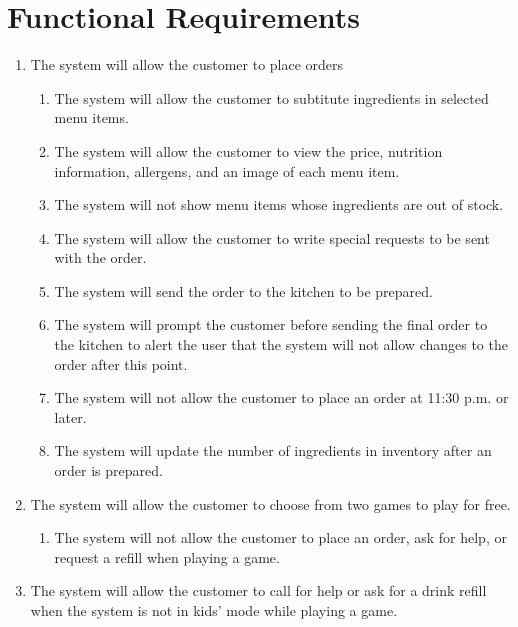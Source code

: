 \documentclass[12pt]{article}
\begin{document}
	\section{Functional Requirements}
		\begin{enumerate}
			\item The system will allow the customer to place orders
			\begin{enumerate}
				\item The system will allow the customer to subtitute ingredients in selected menu items.
				\item The system will allow the customer to view the price, nutrition information, allergens, and an image of each menu item.
				\item The system will not show menu items whose ingredients are out of stock.
				\item The system will allow the customer to write special requests to be sent with the order.
				\item The system will send the order to the kitchen to be prepared.
				\item The system will prompt the customer before sending the final order to the kitchen to alert the user that the system will not allow changes to the order after this point.
				\item The system will not allow the customer to place an order at 11:30 p.m. or later.
				\item The system will update the number of ingredients in inventory after an order is prepared.
			\end{enumerate}

			\item The system will allow the customer to choose from two games to play for free.
				\begin{enumerate}
					\item The system will not allow the customer to place an order, ask for help, or request a refill when playing a game.
				\end{enumerate}

			\item The system will allow the customer to call for help or ask for a drink refill when the system is not in kids' mode while playing a game.


\end{enumerate}
\end{document}
